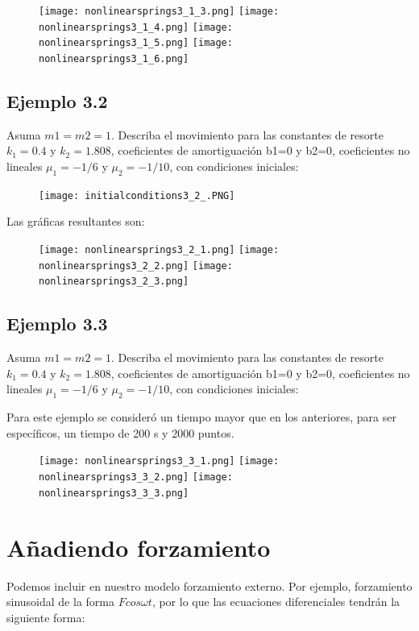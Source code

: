 \documentclass[a4paper]{article}
\begin{document}
\begin{figure}[ht!]
\centering
\texttt{[image: nonlinearsprings3\_1\_3.png]}
\texttt{[image: nonlinearsprings3\_1\_4.png]}
\texttt{[image: nonlinearsprings3\_1\_5.png]}
\texttt{[image: nonlinearsprings3\_1\_6.png]}
\end{figure}

\subsection{Ejemplo 3.2}

Asuma $m1=m2=1$. Describa el movimiento para las constantes de resorte $k_1=0.4$ y $k_2=1.808$, coeficientes de amortiguación b1=0 y b2=0, coeficientes no lineales $\mu_1=-1/6$ y $\mu_2=-1/10$, con condiciones iniciales:

\begin{figure}[ht!]
\centering
\texttt{[image: initialconditions3\_2\_.PNG]}
\end{figure}

Las gráficas resultantes son:

\begin{figure}[ht!]
\centering
\texttt{[image: nonlinearsprings3\_2\_1.png]}
\texttt{[image: nonlinearsprings3\_2\_2.png]}
\texttt{[image: nonlinearsprings3\_2\_3.png]}
\end{figure}

\newpage


\subsection{Ejemplo 3.3}

Asuma $m1=m2=1$. Describa el movimiento para las constantes de resorte $k_1=0.4$ y $k_2=1.808$, coeficientes de amortiguación b1=0 y b2=0, coeficientes no lineales $\mu_1=-1/6$ y $\mu_2=-1/10$, con condiciones iniciales:


Para este ejemplo se consideró un tiempo mayor que en los anteriores, para ser específicos, un tiempo de 200 s y 2000 puntos.

\begin{figure}[ht!]
\centering
\texttt{[image: nonlinearsprings3\_3\_1.png]}
\texttt{[image: nonlinearsprings3\_3\_2.png]}
\texttt{[image: nonlinearsprings3\_3\_3.png]}
\end{figure}



\section{Añadiendo forzamiento}
Podemos incluir en nuestro modelo forzamiento externo. Por ejemplo, forzamiento sinusoidal de la forma $Fcos\omega t$, por lo que las ecuaciones diferenciales tendrán la siguiente forma:
\end{document}
